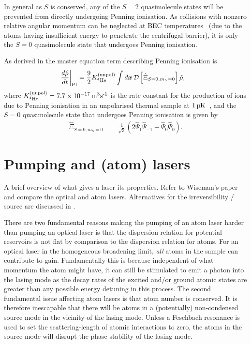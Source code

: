 In general as $S$ is conserved, any of the $S=2$ quasimolecule states will be prevented from directly undergoing Penning ionisation. As collisions with nonzero relative angular momentum can be neglected at BEC temperatures~\citep{Venturi:2000,Stas:2006kx} (due to the atoms having insufficient energy to penetrate the centrifugal barrier), it is only the $S=0$ quasimolecule state that undergoes Penning ionisation.

As derived in  the master equation term describing Penning ionisation is
\begin{align}
    \left.\frac{d \hat{\rho}}{dt}\right|_\text{PI} &= \frac{9}{2} K^\text{(unpol)}_{^4\text{He}} \int d \bm{x}\, \mathcal{D}\left[ \hat{\Xi}_{S=0, m_S=0}\right] \hat{\rho},
\end{align}
where $\Kunpol = \unit[7.7\times 10^{-17}]{m\textsuperscript{3}s\textsuperscript{-1}}$ is the rate constant for the production of ions due to Penning ionisation in an unpolarised thermal sample at $\unit[1]{\micro K}$~\citep{Stas:2006kx}, and the $S=0$ quasimolecule state that undergoes Penning ionisation is given by
\begin{align}
    \hat{\Xi}_{S=0, m_S=0} &= \frac{1}{\sqrt{3}} \left( 2 \hat{\Psi}_1 \hat{\Psi}_{-1} - \hat{\Psi}_0 \hat{\Psi}_0\right).
\end{align}

\section{Pumping and (atom) lasers}
\label{BackgroundTheory:Lasers}
A brief overview of what gives a laser its properties. Refer to Wiseman's paper~\citep{Wiseman:1997ba} and compare the optical and atom lasers. Alternatives for the irreversibility / source are discussed in .

There are two fundamental reasons making the pumping of an atom laser harder than pumping an optical laser is that the dispersion relation for potential reservoirs is not flat by comparison to the dispersion relation for atoms.  For an optical laser in the homogeneous broadening limit, \emph{all} atoms in the sample can contribute to gain.  Fundamentally this is because independent of what momentum the atom might have, it can still be stimulated to emit a photon into the lasing mode as the decay rates of the excited and/or ground atomic states are greater than any possible energy detuning in this process.  The second fundamental issue affecting atom lasers is that atom number is conserved.  It is therefore inescapable that there will be atoms in a (potentially) non-condensed source mode in the vicinity of the lasing mode.  Unless a Feschbach resonance is used to set the scattering-length of atomic interactions to zero, the atoms in the source mode will disrupt the phase stability of the lasing mode.

